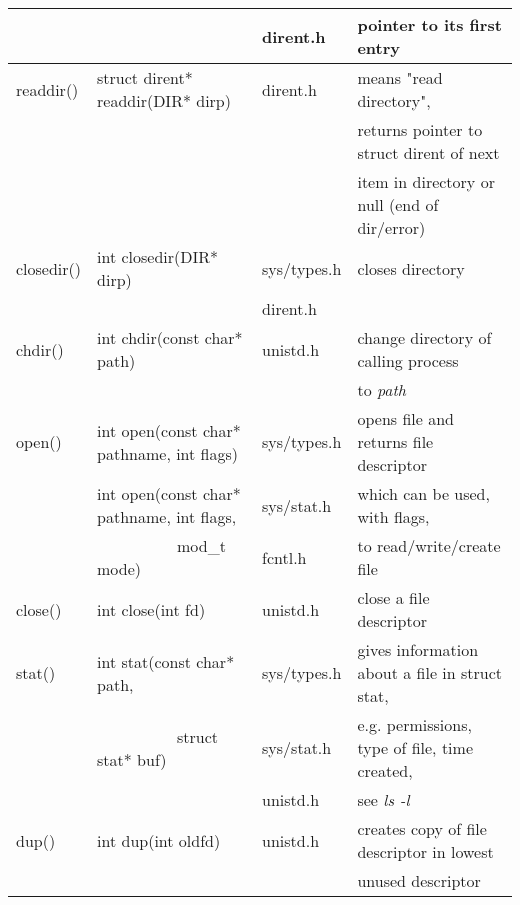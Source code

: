 \documentclass{article}
\begin{document}
\begin{longtable}{llll}
    \\
    & & dirent.h & pointer to its first entry
    \\ \hline
    readdir() & struct dirent* readdir(DIR* dirp) & dirent.h & means "read directory",
    \\
    & & & returns pointer to struct dirent of next 
    \\
    & & & item in directory or null (end of dir/error)
    \\ \hline
    closedir() & int closedir(DIR* dirp) & sys/types.h & closes  directory
    \\
    & & dirent.h & %
    \\  \hline
    chdir() & int chdir(const char* path) & unistd.h & change directory of calling process
    \\
    & & & to \it path \rm
    \\ \hline
    open() & int open(const char* pathname, int flags) & sys/types.h & opens file and returns file descriptor
    \\
    & int open(const char* pathname, int flags, & sys/stat.h & which can be used, with flags,
    \\
    & \ \ \ \ \ \ \ \ \ \ mod\_t mode) & fcntl.h & to read/write/create file
    \\ \hline
    close() & int close(int fd) & unistd.h & close a file descriptor
    \\ \hline
    stat() & int stat(const char* path, & sys/types.h & gives information about a file in struct stat,
    \\
    & \ \ \ \ \ \ \ \ \ \ struct stat* buf) & sys/stat.h & e.g. permissions, type of file, time created,
    \\
    & & unistd.h & see \it ls -l \rm
    \\ \hline
    dup() & int dup(int oldfd) & unistd.h & creates copy of file descriptor in lowest 
    \\ 
    & & &unused descriptor 


\end{longtable}
\end{document}
